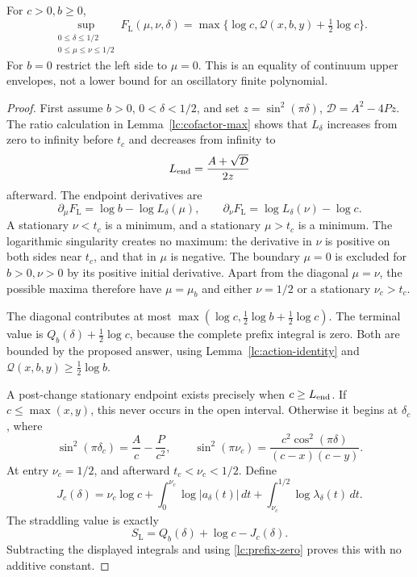 \begin{proposition}\label{lc:left-maximum}
For \(c>0,b\ge0\),
\begin{equation}\label{lc:left-envelope}
 \sup_{\substack{0\le\delta\le1/2\\0\le\mu\le\nu\le1/2}}
 F_{\mathrm L}(\mu,\nu,\delta)
       =\max\{\log c,\mathcal Q(x,b,y)+\tfrac12\log c\}.
\end{equation}
For \(b=0\) restrict the left side to \(\mu=0\).
This is an equality of continuum upper envelopes, not a lower
bound for an oscillatory finite polynomial.
\end{proposition}
\begin{proof}
First assume \(b>0\), \(0<\delta<1/2\), and set
\(z=\sin^2(\pi\delta)\), \(\mathcal D=A^2-4Pz\).
The ratio calculation in Lemma~\ref{lc:cofactor-max} shows that
\(L_\delta\) increases from zero to infinity before \(t_c\) and
decreases from infinity to
\[
                         L_{\rm end}=\frac{A+\sqrt{\mathcal D}}{2z}
\]
afterward. The endpoint derivatives are
\[
 \partial_\mu F_{\mathrm L}=\log b-\log L_\delta(\mu),\qquad
 \partial_\nu F_{\mathrm L}=\log L_\delta(\nu)-\log c.
\]
A stationary \(\nu<t_c\) is a minimum, and a stationary \(\mu>t_c\)
is a minimum. The logarithmic singularity creates no maximum:
the derivative in \(\nu\) is positive on both sides near \(t_c\),
and that in \(\mu\) is negative. The boundary \(\mu=0\) is excluded
for \(b>0,\nu>0\) by its positive initial derivative.
Apart from the diagonal \(\mu=\nu\), the possible maxima therefore
have \(\mu=\mu_b\) and either \(\nu=1/2\) or a stationary
\(\nu_c>t_c\).

The diagonal contributes at most
\(\max(\log c,\frac12\log b+\frac12\log c)\).
The terminal value is \(Q_b(\delta)+\frac12\log c\), because the
complete prefix integral is zero. Both are bounded by the proposed
answer, using Lemma~\ref{lc:action-identity} and
\(\mathcal Q(x,b,y)\ge\frac12\log b\).

A post-change stationary endpoint exists precisely when
\(c\ge L_{\rm end}\). If \(c\le\max(x,y)\), this never occurs
in the open interval. Otherwise it begins at \(\delta_c\), where
\begin{equation}\label{lc:nu-c}
 \sin^2(\pi\delta_c)=\frac Ac-\frac P{c^2},\qquad
 \sin^2(\pi\nu_c)
       =\frac{c^2\cos^2(\pi\delta)}{(c-x)(c-y)}.
\end{equation}
At entry \(\nu_c=1/2\), and afterward \(t_c<\nu_c<1/2\).
Define
\[
 J_c(\delta)=\nu_c\log c+
 \int_0^{\nu_c}\log|a_\delta(t)|\,dt+
 \int_{\nu_c}^{1/2}\log\lambda_\delta(t)\,dt.
\]
The straddling value is exactly
\begin{equation}\label{lc:straddling}
                  S_{\mathrm L}=Q_b(\delta)+\log c-J_c(\delta).
\end{equation}
Subtracting the displayed integrals and using
\eqref{lc:prefix-zero} proves this with no additive constant.


\end{proof}
